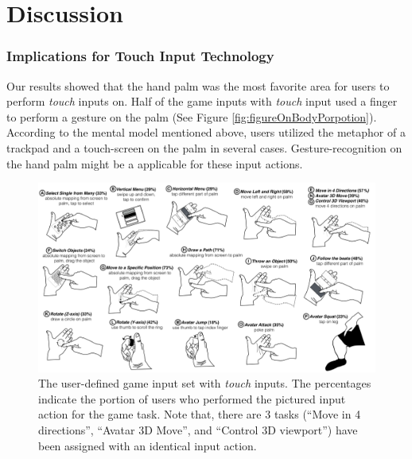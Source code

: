 \documentclass{sigchi}
\begin{document}
  \section{Discussion}

    \subsubsection{Implications for Touch Input Technology}
    Our results showed that the hand palm was the most favorite area for users to perform \emph{touch} inputs on. Half of the game inputs with \emph{touch} input used a finger to perform a gesture on the palm (See Figure \ref{fig:figureOnBodyPorpotion}). According to the mental model mentioned above, users utilized the metaphor of a trackpad and a touch-screen on the palm in several cases. Gesture-recognition on the hand palm might be a applicable for these input actions.


   


  \begin{figure}
  \centering
  \includegraphics[width=1\textwidth]{OnBodyInputSet.pdf}
  \caption{The user-defined game input set with \emph{touch} inputs. The percentages indicate the portion of users who performed the pictured input action for the game task. Note that, there are 3 tasks (``Move in 4 directions'', ``Avatar 3D Move'', and ``Control 3D viewport'') have been assigned with an identical input action.}
  \label{fig:OnBodyInputSet}
  \end{figure}
\end{document}
